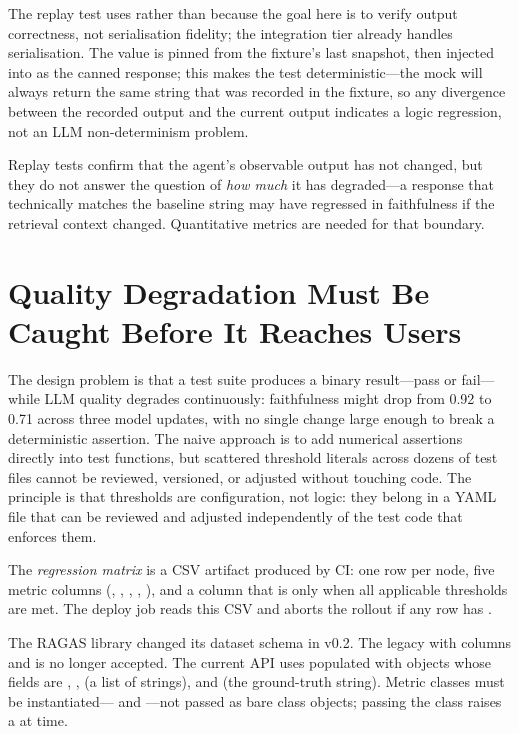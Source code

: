 The replay test uses  rather than
 because the goal here is to verify output
correctness, not serialisation fidelity; the integration tier already
handles serialisation.
The  value is pinned from the fixture's last snapshot,
then injected into  as the canned response; this
makes the test deterministic---the mock will always return the same
string that was recorded in the fixture, so any divergence between the
recorded output and the current output indicates a logic regression,
not an LLM non-determinism problem.

Replay tests confirm that the agent's observable output has not changed,
but they do not answer the question of \emph{how much} it has
degraded---a response that technically matches the baseline string may
have regressed in faithfulness if the retrieval context changed.
Quantitative metrics are needed for that boundary.

\section{Quality Degradation Must Be Caught Before It Reaches Users}
\label{sec:regression-matrix}

The design problem is that a test suite produces a binary result---pass
or fail---while LLM quality degrades continuously: faithfulness might
drop from 0.92 to 0.71 across three model updates, with no single
change large enough to break a deterministic assertion.
The naive approach is to add numerical assertions directly into test
functions, but scattered threshold literals across dozens of test files
cannot be reviewed, versioned, or adjusted without touching code.
The principle is that thresholds are configuration, not logic: they
belong in a YAML file that can be reviewed and adjusted independently
of the test code that enforces them.

The \emph{regression matrix} is a CSV artifact produced by CI: one row
per node, five metric columns (, ,
, , ),
and a  column that is  only when all applicable
thresholds are met.
The deploy job reads this CSV and aborts the rollout if any row has
.

\begin{notebox}
The RAGAS library changed its dataset schema in v0.2.
The legacy  with columns 
and  is no longer accepted.
The current API uses  populated with
 objects whose fields are ,
,  (a list of strings), and
 (the ground-truth string).
Metric classes must be instantiated--- and
---not passed as bare class objects;
passing the class raises a  at  time.
\end{notebox}


